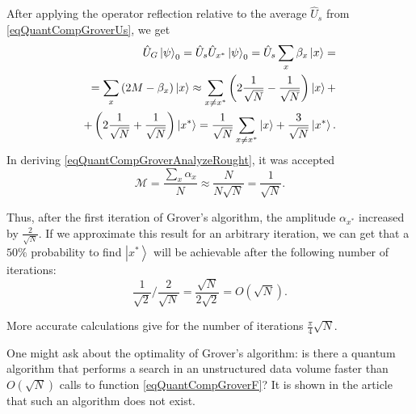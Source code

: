 After applying the operator reflection relative to the average $\hat{U}_s$ 
from \eqref{eqQuantCompGroverUs}, we get
\begin{eqnarray}
\hat{U}_G \left|\psi\right>_0 = 
\hat{U}_s \hat{U}_{x^{\ast}} \left|\psi\right>_0 = 
\hat{U}_s \sum_x \beta_x \ket{x} = 
\nonumber \\
= \sum_x \left(2 M - \beta_x\right) \ket{x} \approx 
\sum_{x\ne x^{\ast}} \left( 2 \frac{1}{\sqrt{N}} - \frac{1}{\sqrt{N}}
\right) \ket{x} + 
\nonumber \\
+ \left( 2 \frac{1}{\sqrt{N}} +
\frac{1}{\sqrt{N}} \right) \left|x^{\ast}\right> = 
\frac{1}{\sqrt{N}}\sum_{x\ne x^{\ast}} \ket{x} + 
\frac{3}{\sqrt{N}} \left|x^{\ast}\right>.
\label{eqQuantCompGroverAnalyzeRought}
\end{eqnarray}
In deriving \eqref{eqQuantCompGroverAnalyzeRought}, it was accepted  
\[
\mathcal{M} = \frac{\sum_x \alpha_x}{N} \approx
\frac{N}{N \sqrt{N}} = \frac{1}{\sqrt{N}}.
\]

Thus, after the first iteration of Grover's algorithm, the amplitude
$\alpha_{x^{\ast}}$ increased by $\frac{2}{\sqrt{N}}$. If
we approximate this result for an arbitrary iteration, we can
get that a $50\%$ probability to find $\left|x^{\ast}\right>$
will be achievable after the following number of iterations:
\[
\frac{1}{\sqrt{2}}/\frac{2}{\sqrt{N}} =
\frac{\sqrt{N}}{2 \sqrt{2}} = O\left(\sqrt{N}\right).
\]

More accurate calculations \cite{nielsen2000quantum} give for the number of iterations
$\frac{\pi}{4}\sqrt{N}$. 

One might ask about the optimality of Grover's algorithm: is there
a quantum algorithm that performs a search in an unstructured
data volume faster than $O\left(\sqrt{N}\right)$ calls to
function \eqref{eqQuantCompGroverF}? It is shown in the article
\cite{bBennettGroverOptimal} that such an algorithm
does not exist.